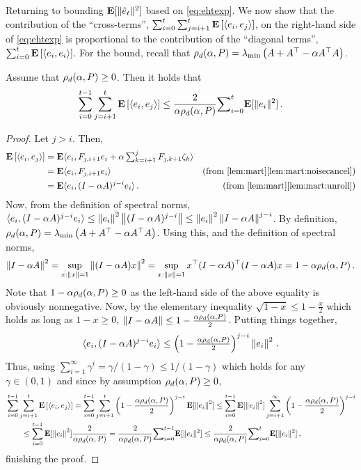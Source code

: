 Returning to bounding $\mathbf{E}[ \| \hat{e}_t\|^2 ]$ based on \eqref{eq:ehtexp}.
We now show that the contribution of the ``cross-terms'', $\sum_{i=0}^t \sum_{j=i+1}^t \mathbf{E}\left[ \langle e_i,e_j\rangle \right]$, 
on the right-hand side of \eqref{eq:ehtexp}
is proportional to the contribution of the ``diagonal terms'', $\sum_{i=0}^t \mathbf{E}\left[ \langle e_i,e_i\rangle \right]$.
For the bound, recall that $\rho_d(\alpha,P) = \lambda_{\min}\left( A + A^\top - \alpha A^\top A \right)$.
\begin{lemma}
\label{lem:crosstermbound}
Assume that $\rho_d(\alpha,P)\ge 0$. Then it holds that
\begin{align*}
\sum_{i=0}^{t-1}\sum_{j=i+1}^t {\mathbf{E}\left[\langle e_i,e_j\rangle\right]} \le
 \frac2{\alpha\rho_d(\alpha,P)}{\sum}_{i=0}^{t} \mathbf{E}[\| e_i\|^2 ]\,.
\end{align*}
\end{lemma}
\begin{proof}
Let $j>i$. Then, 
\begin{align*}
\EE{\ip{e_i,e_j}}
&=\E \ip{e_i, F_{j,i+1} e_i+\alpha\textstyle\sum_{k=i+1}^j F_{j,k+1}\zeta_{k} }\\
&=\E\ip{e_i,F_{j,i+1} e_i}  &\text{(from \cref{lem:mart}\ref{lem:mart:noisecancel})}\\
&=\E\ip{e_i, (I-\alpha A)^{j-i} e_i}\,. & \text{(from \cref{lem:mart}\ref{lem:mart:unroll})}
\end{align*}
Now, from the definition of spectral norms, $\langle e_i, (I-\alpha A)^{j-i} e_i \rangle \le \left\| e_i\right\|^2 \left\| (I-\alpha A)^{j-i}\right\|
\le \left\| e_i\right\|^2 \left\|  I-\alpha A \right\|^{j-i}$.
By definition, $\rho_d(\alpha,P) = \lambda_{\min}\left( A + A^\top - \alpha A^\top A \right)$.
Using this, and the definition of spectral norms,
\begin{align*}
\left\| I-\alpha A\right\|^2 = \sup_{x:\left\| x\right\|=1} \left\|  (I-\alpha A) x \right\|^2 = \sup_{x:\left\| x\right\|=1} x^\top (I-\alpha A)^\top (I-\alpha A) x = 1- \alpha \rho_d(\alpha,P)\,.
\end{align*}
Note that $1-\alpha \rho_d(\alpha,P)\ge 0$ as the left-hand side of the above equality is obviously nonnegative.
Now, by the elementary inequality $\sqrt{1-x} \le 1- \frac{x}{2}$ which holds as long as $1-x\ge 0$,
$\left\| I-\alpha A\right\| \le 1- \frac{\alpha \rho_d(\alpha,P)}{2}$. Putting things together,
\begin{align*}
\langle e_i, (I-\alpha A)^{j-i} e_i \rangle \le \left(1- \tfrac{\alpha \rho_d(\alpha,P)}{2} \right)^{j-i} \left\| e_i\right\|^2 \,.
\end{align*}
Thus, using $\sum_{i=1}^\infty \gamma^i 
= \gamma/(1-\gamma) \le 1/(1-\gamma)$ which holds for any $\gamma\in (0,1)$
and since by assumption $\rho_d(\alpha,P)\ge 0$,
\begin{align*}
\label{inter}
\MoveEqLeft 
\sum_{i=0}^{t-1}\sum_{j=i+1}^t {\EE{\ip{e_i,e_j}}}
=\sum_{i=0}^{t-1}\sum_{j=i+1}^t \left(1-\frac{\alpha\rhod{P}}{2}\right)^{j-i} \E[\norm{e_i}^2]
\leq \sum_{i=0}^{t-1} \E[\norm{e_i}^2] \sum_{j=i+1}^\infty \left(1-\frac{\alpha\rhod{P}}{2}\right)^{j-i} \\
&\leq \sum_{i=0}^{t-1} \E[\norm{e_i}^2] \frac{2}{\alpha \rhod{P}}
=\frac2{\alpha\rhod{P}} {\sum}_{i=0}^{t-1}\E[\normsm{e_i}^2]
\leq \frac2{\alpha\rhod{P}}{\sum}_{i=0}^{t}\E[\normsm{e_i}^2]\,,
\end{align*}
finishing the proof.
\end{proof}


